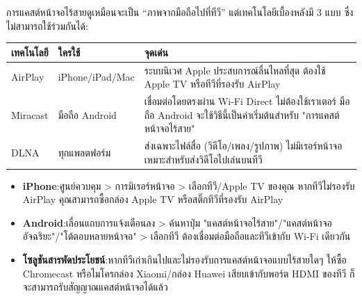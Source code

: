 


การแคสต์หน้าจอไร้สายดูเหมือนจะเป็น “ภาพจากมือถือไปที่ทีวี” แต่เทคโนโลยีเบื้องหลังมี 3 แบบ ซึ่งไม่สามารถใช้ร่วมกันได้:

\begin{center}
\begin{tabularx}{\linewidth}{|X|X|X|}
\hline
\textbf{เทคโนโลยี} & \textbf{ใครใช้} & \textbf{จุดเด่น} \tabularnewline
\hline
AirPlay & iPhone/iPad/Mac & ระบบนิเวศ Apple ประสบการณ์ลื่นไหลที่สุด ต้องใช้ Apple TV หรือทีวีที่รองรับ AirPlay \tabularnewline
Miracast & มือถือ Android & เชื่อมต่อโดยตรงผ่าน Wi-Fi Direct ไม่ต้องใช้เราเตอร์ มือถือ Android จะใช้วิธีนี้เป็นค่าเริ่มต้นสำหรับ "การแคสต์หน้าจอไร้สาย" \tabularnewline
DLNA & ทุกแพลตฟอร์ม & ส่งเฉพาะไฟล์สื่อ (วิดีโอ/เพลง/รูปภาพ) ไม่มิเรอร์หน้าจอ เหมาะสำหรับส่งวิดีโอไปเล่นบนทีวี \tabularnewline
\hline
\end{tabularx}
\end{center}


\begin{itemize}
  \item \textbf{iPhone}:ศูนย์ควบคุม > การมิเรอร์หน้าจอ > เลือกทีวี/Apple TV ของคุณ หากทีวีไม่รองรับ AirPlay คุณสามารถซื้อกล่อง Apple TV หรือสติ๊กทีวีที่รองรับ AirPlay
  \item \textbf{Android}:เลื่อนแถบการแจ้งเตือนลง > ค้นหาปุ่ม "แคสต์หน้าจอไร้สาย"/"แคสต์หน้าจออัจฉริยะ"/"โต้ตอบหลายหน้าจอ" > เลือกทีวี ต้องเชื่อมต่อมือถือและทีวีเข้ากับ Wi-Fi เดียวกัน
  \item \textbf{โซลูชันสารพัดประโยชน์}:หากทีวีเก่าเกินไปและไม่รองรับการแคสต์หน้าจอแบบไร้สายใดๆ ให้ซื้อ Chromecast หรือไมโครกล่อง Xiaomi/กล่อง Huawei เสียบเข้ากับพอร์ต HDMI ของทีวี ก็จะสามารถรับสัญญาณแคสต์หน้าจอได้แล้ว
\end{itemize}



